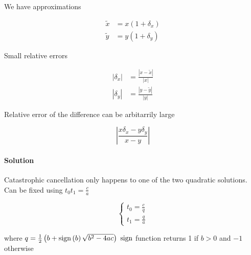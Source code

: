       We have approximations

      \begin{align}
        \tilde{x} &= x \left( 1 + \delta_{x} \right) \\
        \tilde{y} &= y \left( 1 + \delta_{y} \right)
      \end{align}

      Small relative errors

      \begin{align}
        \left| \delta_{x} \right| &= \frac{\left| x - \tilde{x} \right|}{\left| x \right|} \\
        \left| \delta_{y} \right| &= \frac{\left| y - \tilde{y} \right|}{\left| y \right|}
      \end{align}

      Relative error of the difference can be arbitarrily large

      \begin{equation}
        \left| \frac{x \delta_{x} - y \delta_{y}}{x - y} \right|
      \end{equation}

      \paragraph{Solution} Catastrophic cancellation only happens to one of the
      two quadratic solutions. Can be fixed using $ t_{0} t_{1} = \frac{c}{a} $

      \begin{equation}
        \begin{cases}
          t_{0} = \frac{c}{q} \\
          t_{1} = \frac{q}{a}
        \end{cases}
      \end{equation}

      where $ q = \frac{1}{2}\left( b + \operatorname{sign}\left( b \right) \sqrt{b^{2} - 4ac} \right) $
      $ \operatorname{sign} $ function returns 1 if $ b > 0 $ and $ - 1 $ otherwise
